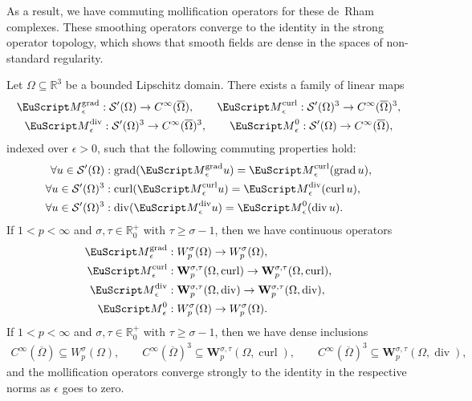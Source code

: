 \documentclass[10pt,a4paper]{amsart}
\theoremstyle{definition}
\theoremstyle{remark}
\numberwithin{equation}{section}
\newcommand{\bbR}{{\mathbb R}}
\newcommand{\bfW}{{\mathbf W}}
\newcommand{\calS}{{\mathcal S}}
\newcommand{\euM}{{\EuScript M}}
\newcommand{\closure}{\overline}
\newcommand{\Domain}{{\Omega}}
\newcommand{\Mollifier}{{\euM}}
\newcommand{\grad}{\operatorname{grad}}
\newcommand{\curl}{\operatorname{curl}}
\newcommand{\divergence}{\operatorname{div}}
\begin{document}
As a result, we have commuting mollification operators for these de~Rham complexes. 
These smoothing operators converge to the identity in the strong operator topology, which shows that smooth fields are dense in the spaces of non-standard regularity. 

\begin{theorem}
    Let $\Domain \subseteq \bbR^{3}$ be a bounded Lipschitz domain. 
    There exists a family of linear maps 
    \begin{gather*}
        \Mollifier^{\grad}_{\epsilon} : \calS'(\Domain) \to C^{\infty}(\closure\Domain),
        \qquad
        \Mollifier^{\curl}_{\epsilon} : \calS'(\Domain)^{3} \to C^{\infty}(\closure\Domain)^{3},
        \\
        \Mollifier^{\divergence}_{\epsilon} : \calS'(\Domain)^{3} \to C^{\infty}(\closure\Domain)^{3},
        \qquad
        \Mollifier^{0}_{\epsilon} : \calS'(\Domain) \to C^{\infty}(\closure\Domain),
    \end{gather*}
    indexed over $\epsilon > 0$, 
    such that the following commuting properties hold:
    \begin{align*}
        \forall u \in \calS'(\Domain)
        &: \grad (\Mollifier^{\grad}_{\epsilon} u) = \Mollifier^{\curl}_{\epsilon} (\grad u),
        \\
        \forall u \in \calS'(\Domain)^{3}
        &: \curl (\Mollifier^{\curl}_{\epsilon} u) = \Mollifier^{\divergence}_{\epsilon} (\curl u),
        \\
        \forall u \in \calS'(\Domain)^{3}
        &: \divergence (\Mollifier^{\divergence}_{\epsilon} u) = \Mollifier^{0}_{\epsilon} (\divergence u).
    \end{align*}
    If $1 < p < \infty$ and $\sigma, \tau \in \bbR_{0}^{+}$ with $\tau \geq \sigma-1$, then we have continuous operators
    \begin{align*}
        \Mollifier^{\grad}_{\epsilon} &: W^{\sigma}_{p}(\Domain) \to W^{\sigma}_{p}(\Domain),
        \\
        \Mollifier^{\curl}_{\epsilon} &: \bfW^{\sigma,\tau}_{p}(\Domain,\curl) \to \bfW^{\sigma,\tau}_{p}(\Domain,\curl),
        \\
        \Mollifier^{\divergence}_{\epsilon} &: \bfW^{\sigma,\tau}_{p}(\Domain,\divergence) \to \bfW^{\sigma,\tau}_{p}(\Domain,\divergence),
        \\
        \Mollifier^{0}_{\epsilon} &: W^{\sigma}_{p}(\Domain) \to W^{\sigma}_{p}(\Domain)
        .
    \end{align*}
    If $1 < p < \infty$ and $\sigma, \tau \in \bbR_{0}^{+}$ with $\tau \geq \sigma-1$, then we have dense inclusions
    \begin{align*}
        C^{\infty}(\closure\Domain) \subseteq W^{\sigma}_{p}(\Domain),
        \qquad
        C^{\infty}(\closure\Domain)^{3} \subseteq \bfW^{\sigma,\tau}_{p}(\Domain,\curl),
        \qquad
        C^{\infty}(\closure\Domain)^{3} \subseteq \bfW^{\sigma,\tau}_{p}(\Domain,\divergence)
        ,
    \end{align*}
    and the mollification operators converge strongly to the identity in the respective norms as $\epsilon$ goes to zero.
\end{theorem}
\end{document}

